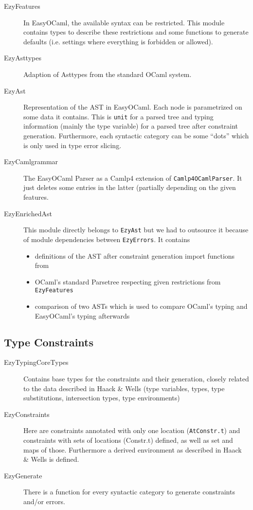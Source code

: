 \begin{description}
    \item[EzyFeatures] In EasyOCaml, the available syntax can be 
        restricted.  This module contains types to describe these 
        restrictions and some functions to generate defaults (i.e. 
        settings where everything is forbidden or allowed).
    \item[EzyAsttypes] Adaption of Asttypes from the standard OCaml 
        system.
    \item[EzyAst] Representation of the AST in EasyOCaml.  Each node 
        is parametrized on some data it contains.  This is \texttt{unit} 
        for a parsed tree and typing information (mainly the type 
        variable) for a parsed tree after constraint generation. 
        Furthermore, each syntactic category can be some ``dots'' which 
        is only used in type error slicing.
    \item[EzyCamlgrammar] The EasyOCaml Parser as a Camlp4 extension 
        of \texttt{Camlp4OCamlParser}.  It just deletes some entries in 
        the latter (partially depending on the given features.
    \item[EzyEnrichedAst] This module directly belongs to 
        \texttt{EzyAst} but we had to outsource it because of module 
        dependencies between \texttt{EzyErrors}.  It contains
        \begin{itemize}
            \item definitions of the AST after constraint generation 
                import functions from
            \item OCaml's standard Parsetree respecting given 
                restrictions from \texttt{EzyFeatures}
            \item comparison of two ASTs which is used to compare 
                OCaml's typing and EasyOCaml's typing afterwards
        \end{itemize}
\end{description}


\subsection{Type Constraints}

\begin{description}
    \item[EzyTypingCoreTypes] Contains base types for the 
        constraints and their generation, closely related to the data 
        described in Haack \& Wells (type variables, types, type 
        substitutions, intersection types, type environments)
    \item[EzyConstraints] Here are constraints annotated with only 
        one location (\texttt{AtConstr.t}) and constraints with sets of 
        locations (Constr.t) defined, as well as set and maps of those.  
        Furthermore a derived environment as described in Haack \& Wells 
        is defined.
    \item[EzyGenerate] There is a function for every syntactic 
        category to generate constraints and/or errors.
\end{description}

